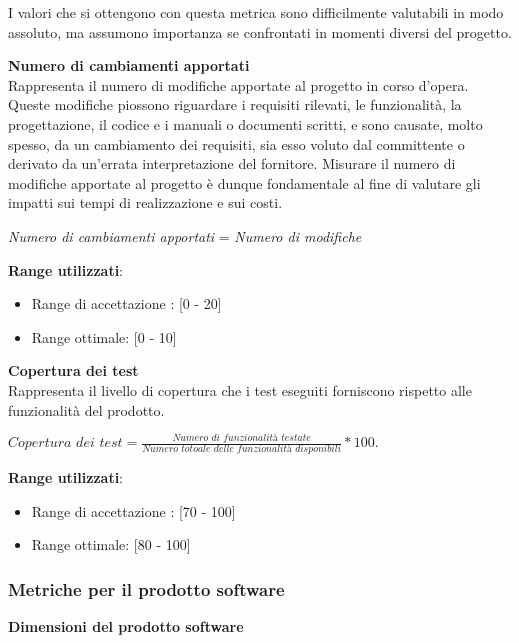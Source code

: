 I valori che si ottengono con questa metrica sono difficilmente valutabili in modo assoluto, ma assumono importanza se confrontati in momenti diversi del progetto.

\textbf{Numero di cambiamenti apportati}\\

Rappresenta il numero di modifiche apportate al progetto in corso d'opera. Queste modifiche piossono riguardare i requisiti rilevati, le funzionalit\`a, la progettazione, il codice e i manuali o documenti scritti, e sono causate, molto spesso, da un cambiamento dei requisiti, sia esso voluto dal committente o derivato da un'errata interpretazione del fornitore. Misurare il numero di modifiche apportate al progetto \`e dunque fondamentale al fine di valutare gli impatti sui tempi di realizzazione e sui costi.
\begin{center}
	\textit{Numero di cambiamenti apportati} = \textit{Numero di modifiche}
\end{center}
\textbf{Range utilizzati}:
\begin{itemize}
	\item Range di accettazione : [0 - 20]
	\item Range ottimale: [0 - 10]
\end{itemize}

\textbf{Copertura dei test}\\

Rappresenta il livello di copertura che i test eseguiti forniscono rispetto alle funzionalit\`a del prodotto. \\
\begin{center}
\begin{math}
	\textit{Copertura dei test} = \frac{\textit{Numero di funzionalit\`a testate}}{\textit{Numero totoale delle funzionalit\`a disponibili}} * 100.
\end{math}
\end{center}
\textbf{Range utilizzati}:
\begin{itemize}
	\item Range di accettazione : [70 - 100]
	\item Range ottimale: [80 - 100]
\end{itemize}

\subsubsection{Metriche per il prodotto software}

\textbf{Dimensioni del prodotto software}\\

